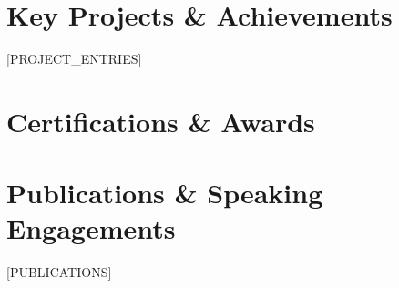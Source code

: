 \documentclass[12pt,letterpaper]{article}
\newcommand{\project}[4]{
    \textbf{\color{darkgray}#1} \hfill {\color{lightgray}#2}\\
    \textit{\color{primaryblue}#3}\\
    \vspace{2pt}
    #4
    \vspace{8pt}
}
\begin{document}
\section{Key Projects \& Achievements}
[PROJECT_ENTRIES]

\section{Certifications \& Awards}
\begin{itemize}[leftmargin=15pt,noitemsep,topsep=0pt]
[CERTIFICATIONS]
\end{itemize}

\section{Publications \& Speaking Engagements}
[PUBLICATIONS]
\end{document}
